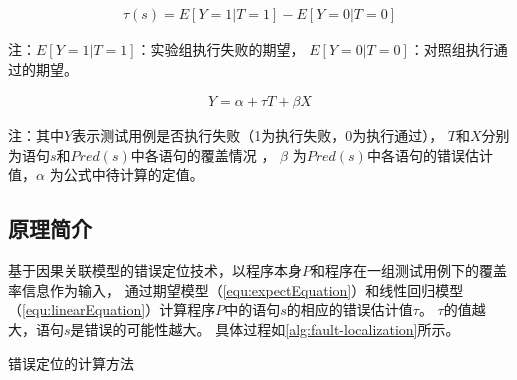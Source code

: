 \begin{equation}
\begin{aligned}
\tau(s) = E[Y=1|T=1] - E [Y=0|T=0] 
\end{aligned}
\label{equ:expectEquation} 
\end{equation}
\begin{scriptsize}
	注：$E[Y=1|T=1]$：实验组执行失败的期望， $E[Y=0|T=0]$：对照组执行通过的期望。
\end{scriptsize}


\begin{equation}
\begin{aligned}
Y =\alpha +\tau T+\beta X 
\end{aligned}
\label{equ:linearEquation} 
\end{equation}
\begin{scriptsize}
	注：其中$Y$表示测试用例是否执行失败（1为执行失败，0为执行通过），
	$T$和$X$分别为语句$s$和$Pred(s)$中各语句的覆盖情况 ，
	$\beta$ 为$Pred(s)$中各语句的错误估计值，$\alpha$ 为公式中待计算的定值。  \par
	
\end{scriptsize}

\subsection{原理简介}

基于因果关联模型的错误定位技术，以程序本身$P$和程序在一组测试用例下的覆盖率信息作为输入，
通过期望模型（\autoref{equ:expectEquation}）和线性回归模型（\autoref{equ:linearEquation}）计算程序$P$中的语句$s$的相应的错误估计值$\tau$。
$\tau$的值越大，语句$s$是错误的可能性越大。
具体过程如\autoref{alg:fault-localization}所示。



\begin{algorithm}[!ht]
	
	
	\caption{错误定位的计算方法} 
	
	
	\label{alg:fault-localization}
	
	
	
	
\end{algorithm}





